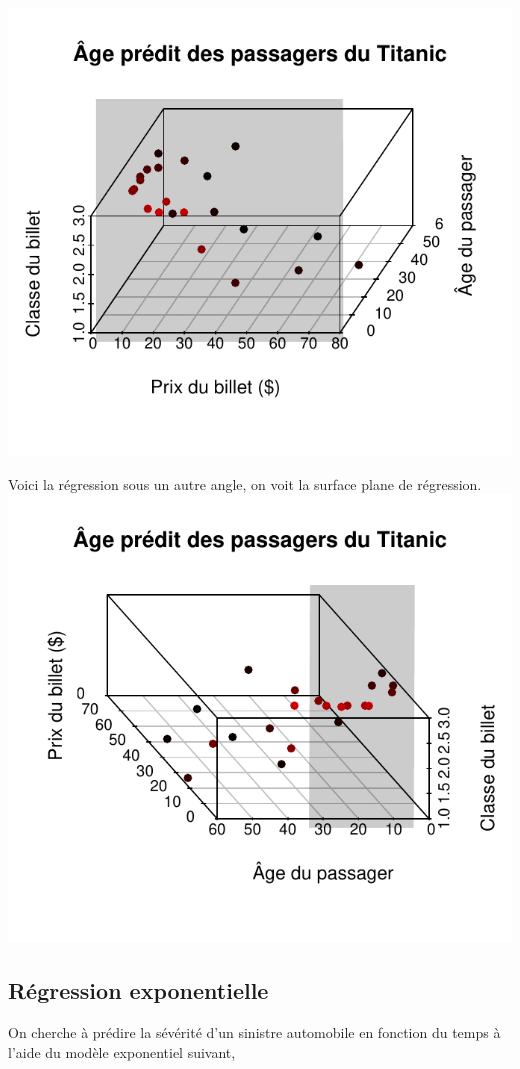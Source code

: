 \documentclass[11pt,french]{report}
\begin{document}
\includegraphics{notes_de_cours-002}

Voici la régression sous un autre angle, on voit la surface plane de régression.
\includegraphics{notes_de_cours-003}

\subsection{Régression exponentielle}
On cherche à prédire la sévérité d'un sinistre automobile en fonction du temps à l'aide du modèle exponentiel suivant,
\end{document}
